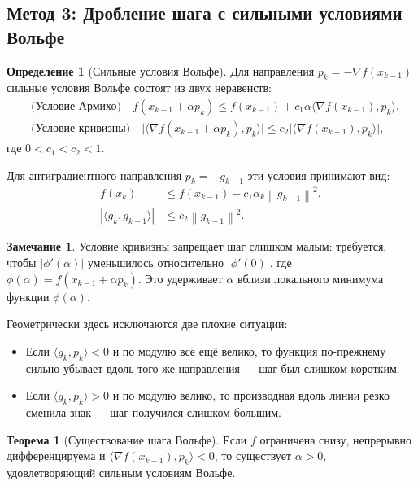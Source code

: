 \documentclass[a4paper,12pt]{article}
\newcommand{\norm}[1]{\left\|#1\right\|}
\newcommand{\grad}{\nabla}
\theoremstyle{definition}
\newtheorem{definition}{Определение}[section]
\newtheorem{theorem}{Теорема}[section]
\newtheorem{remark}{Замечание}[section]
\begin{document}
\subsection{Метод 3: Дробление шага с сильными условиями Вольфе}

\begin{definition}[Сильные условия Вольфе]
    Для направления $p_k = -\grad f(x_{k-1})$ сильные условия Вольфе состоят из двух неравенств:
    \begin{align}
        &\text{(Условие Армихо)} \quad
        f(x_{k-1} + \alpha p_k) \leq f(x_{k-1}) + c_1 \alpha \langle \grad f(x_{k-1}), p_k \rangle, \\
        &\text{(Условие кривизны)} \quad
        \bigl| \langle \grad f(x_{k-1} + \alpha p_k), p_k \rangle \bigr| \leq c_2 \bigl| \langle \grad f(x_{k-1}), p_k \rangle \bigr|,
    \end{align}
    где $0 < c_1 < c_2 < 1$.
\end{definition}

Для антиградиентного направления $p_k = -g_{k-1}$ эти условия принимают вид:
\begin{align}
    f(x_k) &\leq f(x_{k-1}) - c_1 \alpha_k \norm{g_{k-1}}^2, \\
    |\langle g_k, g_{k-1} \rangle| &\leq c_2 \norm{g_{k-1}}^2.
\end{align}

\begin{remark}
    Условие кривизны запрещает шаг слишком малым: требуется, чтобы $|\phi'(\alpha)|$ уменьшилось
    относительно $|\phi'(0)|$, где $\phi(\alpha) = f(x_{k-1} + \alpha p_k)$.
    Это удерживает $\alpha$ вблизи локального минимума функции $\phi(\alpha)$.

    Геометрически здесь исключаются две плохие ситуации:
    \begin{itemize}
        \item Если $\langle g_k, p_k \rangle < 0$ и по модулю всё ещё велико, то функция по-прежнему
              сильно убывает вдоль того же направления — шаг был слишком коротким.
        \item Если $\langle g_k, p_k \rangle > 0$ и по модулю велико, то производная вдоль линии
              резко сменила знак — шаг получился слишком большим.
    \end{itemize}
\end{remark}

\begin{theorem}[Существование шага Вольфе]
    Если $f$ ограничена снизу, непрерывно дифференцируема и $\langle \grad f(x_{k-1}), p_k \rangle < 0$,
    то существует $\alpha > 0$, удовлетворяющий сильным условиям Вольфе.
\end{theorem}
\end{document}
